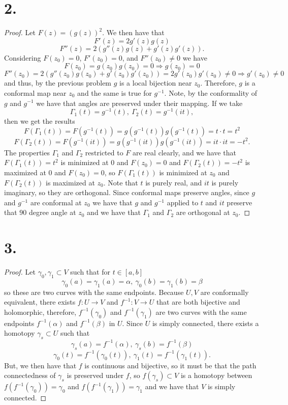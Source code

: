 \documentclass{article}
\begin{document}
\section*{2.}
\begin{proof}
 Let $F(z) = (g(z))^2$. We then have that 
 \[
 F'(z) = 2g'(z)g(z) 
 \] 
 \[
 F''(z) = 2(g''(z)g(z) + g'(z)g'(z)). 
 \]
 Considering $F(z_0) = 0$, $F'(z_0) = 0$, and $F''(z_0) \neq 0$ we have 
 \[
 F(z_0) = g(z_0)g(z_0) = 0 \Rightarrow g(z_0) = 0 
 \]
 \[
 F''(z_0) = 2(g''(z_0)g(z_0) + g'(z_0)g'(z_0)) = 2g'(z_0)g'(z_0) \neq 0  \Rightarrow g'(z_0) \neq 0 
 \]
 and thus, by the previous problem $g$ is a local bijection near $z_0$. Therefore, $g$ is a conformal map near $z_0$ and the same is true for $g^{-1}$. Note, by the conformality of $g$ and $g^{-1}$ we have that angles are preserved under their mapping.  If we take 
 \[
 \Gamma_1(t) = g^{-1}(t), \ \Gamma_2(t) = g^{-1}(it), 
 \]
 then we get the results
 \[
 F(\Gamma_1(t)) = F(g^{-1}(t)) = g(g^{-1}(t))g(g^{-1}(t)) = t\cdot t = t^2
 \]
 \[
 F(\Gamma_2(t)) = F(g^{-1}(it)) = g(g^{-1}(it))g(g^{-1}(it)) = it\cdot it = -t^2. 
 \]
 The properties $\Gamma_1$ and $\Gamma_2$ restricted to $F$ are real clearly, and we have that $F(\Gamma_1(t)) = t^2$ is minimized at $0$ and $F(z_0) = 0$ and $F(\Gamma_2(t)) = -t^2$ is maximized at $0$ and $F(z_0) = 0$, so $F(\Gamma_1(t))$ is minimized at $z_0$ and $F(\Gamma_2(t))$ is maximized at $z_0$. Note that $t$ is purely real, and $it$ is purely imaginary, so they are orthogonal. Since conformal maps preserve angles, since $g$ and $g^{-1}$ are conformal at $z_0$ we have that $g $ and $g^{-1}$ applied to $t$ and $it$ preserve that $90$ degree angle at $z_0$ and we have that $\Gamma_1$ and $\Gamma_2$ are orthogonal at $z_0$.  
\end{proof}


\section*{3.}
\begin{proof}
  Let $\gamma_0, \gamma_1 \subset V$ such that for $t \in [a, b]$\[
  \gamma_0(a) = \gamma_1(a) = \alpha, \ \gamma_0(b) = \gamma_1(b) = \beta  
  \]
  so these are two curves with the same endpoints. Because $U, V$ are conformally equivalent, there exists $f:U\to V$ and $f^{-1}: V \to U$ that are both bijective and holomorphic, therefore, $f^{-1}(\gamma_0)$ and $f^{-1}(\gamma_1)$ are two curves with the same endpoints $f^{-1}(\alpha)$ and $f^{-1}(\beta)$ in $U$. Since $U$ is simply connected, there exists a homotopy $\gamma_s \subset U$ such that 
  \[
    \gamma_s(a) = f^{-1}(\alpha), \ \gamma_s(b) = f^{-1}(\beta)
  \]
  \[
  \gamma_0(t) = f^{-1}(\gamma_0(t)), \ \gamma_1(t) = f^{-1}(\gamma_1(t)).  
  \]
  But, we then have that $f$ is continuous and bijective, so it must be that the path connectedness of $\gamma_s$ is preserved under $f$, so $f(\gamma_s) \subset V$ is a homotopy between $f(f^{-1}(\gamma_0)) = \gamma_0$ and $f(f^{-1}(\gamma_1)) = \gamma_1$ and we have that $V$ is simply connected. 
\end{proof}
\end{document}
